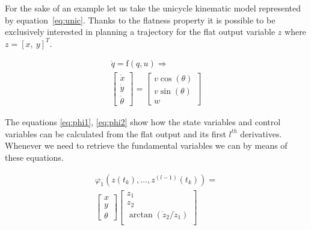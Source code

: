 For the sake of an example let us take the unicycle kinematic model represented by equation~\ref{eq:unic}. Thanks to the flatness property it is possible to be exclusively interested in planning a trajectory for the flat output variable $z$ where $z = [x,\ y]^T$.

\begin{equation}\label{eq:unic}
\begin{array}{c}
\dot{q} = \mathrm{f}(q, u) \Rightarrow\\
\left[\begin{array}{c}
\dot{x}\\
\dot{y}\\
\dot{\theta}
\end{array}\right]=
\left[\begin{array}{c}
v\cos(\theta)\\
v\sin(\theta)\\
w
\end{array}\right]
\end{array}    
\end{equation}

The equations \ref{eq:phi1}, \ref{eq:phi2} show how the state variables and control variables can be calculated from the flat output and its first $l^{th}$ derivatives. Whenever we need to retrieve the fundamental variables we can by means of these equations.

\begin{equation}\label{eq:phi1}
            \begin{array}{l}
            \varphi_1(z(t_k),\dotsc,z^{(l-1)}(t_k))=\\
            \left[\begin{array}{c}
            x\\
            y\\
            \theta
            \end{array}\right]
            \left[\begin{array}{c}
            z_1\\
            z_2\\
            \arctan(\dot{z}_2/\dot{z}_1)\\
            \end{array}\right]
            \end{array}
\end{equation}

